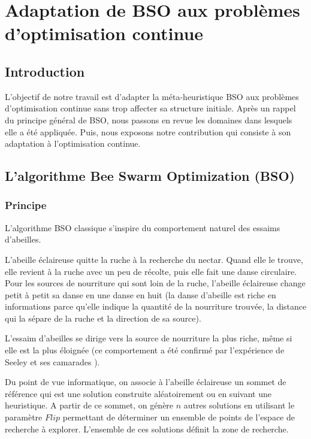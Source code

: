 \chapter {Adaptation de BSO aux problèmes d'optimisation continue}

\section* {Introduction}
L'objectif de notre travail est d'adapter la méta-heuristique BSO aux problèmes d'optimisation continue sans trop affecter sa structure initiale. Après un rappel du principe général de BSO, nous passons en revue les domaines dans lesquels elle a été appliquée. Puis, nous exposons notre contribution qui consiste à son adaptation à l'optimisation continue.

\section{L'algorithme Bee Swarm Optimization (BSO)}

\subsection{Principe}

L’algorithme BSO classique s’inspire du comportement naturel des essaims
d'abeilles.

L'abeille éclaireuse quitte la ruche à la recherche du nectar. Quand
elle le trouve, elle revient à la ruche avec un peu de récolte, puis elle fait une danse circulaire. Pour les sources de nourriture qui sont loin de la ruche, l'abeille éclaireuse change petit à petit sa danse en une danse en huit (la danse d'abeille est riche en informations parce qu'elle indique la
quantité de la nourriture trouvée, la distance qui la sépare de la ruche et la direction de sa source).

L'essaim d'abeilles se dirige vers la source de nourriture la plus riche,
même si elle est la plus éloignée (ce comportement a été confirmé par
l'expérience de Seeley et ses camarades \cite{seeley1991collective}).

Du point de vue informatique, on associe à l'abeille
éclaireuse un sommet de référence qui est une solution construite
aléatoirement ou en suivant une heuristique. A partir de ce sommet, on
génère $n$ autres solutions en utilisant le paramètre $Flip$ permettant de déterminer un ensemble de points de l'espace de recherche à explorer. L’ensemble de
ces solutions définit la zone de recherche.


